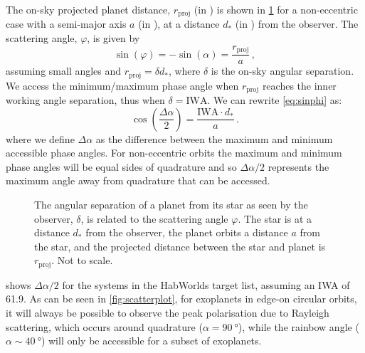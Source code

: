 \documentclass[usenatbib]{mnras}
\newcommand{\HWO}{HabWorlds\xspace}
\begin{document}
The on-sky projected planet distance, $r_\mathrm{proj}$ (in \unit{\au}) is shown in \cref{fig:scattering-angle} for a non-eccentric case with a semi-major axis $a$ (in \unit{\au}), at a distance $d_*$ (in \unit{\parsec}) from the observer.
%
The scattering angle, $\varphi$, is given by
\begin{equation}
    \label{eq:sinphi}
    \sin(\varphi) = - \sin(\alpha) = \frac{r_\mathrm{proj}}{a} \,,
\end{equation}
assuming small angles and $r_\mathrm{proj} = \delta d_*$, where $\delta$ is the on-sky angular separation.
%
We access the minimum/maximum phase angle when $r_\mathrm{proj}$ reaches the inner working angle separation, thus when $\delta = \mathrm{IWA}$. 
%
We can rewrite \cref{eq:sinphi} as:
\begin{equation}
    \label{eq:scattering_angle}
    \cos\left(\dfrac{\Delta \alpha}{2}\right) = \frac{\mathrm{IWA} 
    \cdot d_*}{a} \,.
\end{equation}
where we define $\Delta \alpha$ as the difference between the maximum and 
minimum accessible phase angles. For non-eccentric orbits the maximum and minimum phase angles will be equal sides of quadrature and so $\Delta \alpha / 2$ represents the maximum angle away from quadrature that can be accessed.

\begin{figure}
    \centering
    
    \caption{
        The angular separation of a planet from its star as seen by the observer, $\delta$, is related to the scattering angle $\varphi$. 
        The star is at a distance $d_*$ from the observer, the planet orbits a distance $a$ from the star, and  the projected distance between the star and planet is  $r_\mathrm{proj}$. 
        Not to scale. 
    }
    \label{fig:scattering-angle}
\end{figure}

 shows {\bf $\Delta \alpha / 2$} for the systems in the \HWO target list, assuming an IWA of \qty{61.9}{\mas}.
%
As can be seen in \cref{fig:scatterplot}, for exoplanets in edge-on circular orbits, it will always be possible to observe the peak polarisation due to Rayleigh scattering, which occurs around quadrature ($\alpha=\qty{90}{\degree}$), while the rainbow angle ($\alpha\sim\qty{40}{\degree}$) will only be accessible for a subset of exoplanets.
\end{document}
